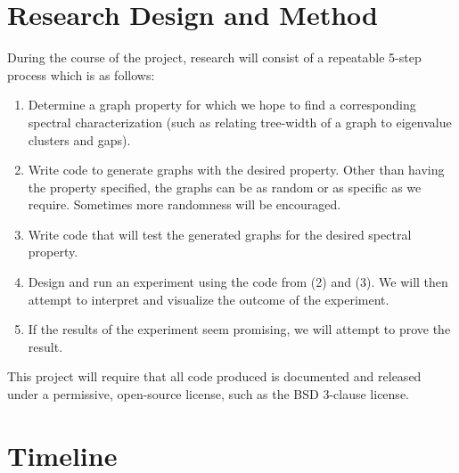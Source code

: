\documentclass[a4paper,10pt]{article}
\begin{document}
	\section{Research Design and Method}

	During the course of the project, research will consist of a repeatable 5-step process which is as follows:
	\begin{enumerate}
		\item Determine a graph property for which we hope to find a corresponding spectral characterization (such as relating tree-width of a graph to eigenvalue clusters and gaps).
		\item Write code to generate graphs with the desired property.  Other than having the property specified, the graphs can be as random or as specific as we require.  Sometimes more randomness will be encouraged.
		\item Write code that will test the generated graphs for the desired spectral property.
		\item Design and run an experiment using the code from (2) and (3).  We will then attempt to interpret and visualize the outcome of the experiment.
		\item If the results of the experiment seem promising, we will attempt to prove the result.
	\end{enumerate}

	This project will require that all code produced is documented and released under a permissive, open-source license, such as the BSD 3-clause license.

	\section{Timeline}
\end{document}
